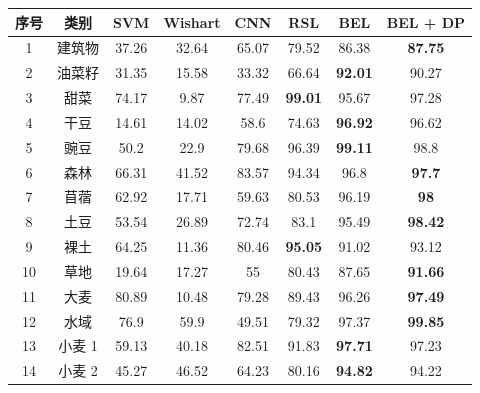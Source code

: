 \begin{table}[ht!]
    \begin{tabular}{cccccccc}
        \toprule[1.5bp]
        序号                        & 类别    & SVM   & Wishart & CNN   & RSL            & BEL            & BEL + DP       \\
        \midrule[0.75bp]
        1                         & 建筑物   & 37.26 & 32.64   & 65.07 & 79.52          & 86.38          & \textbf{87.75} \\
        2                         & 油菜籽   & 31.35 & 15.58   & 33.32 & 66.64          & \textbf{92.01} & 90.27          \\
        3                         & 甜菜    & 74.17 & 9.87    & 77.49 & \textbf{99.01} & 95.67          & 97.28          \\
        4                         & 干豆    & 14.61 & 14.02   & 58.6  & 74.63          & \textbf{96.92} & 96.62          \\
        5                         & 豌豆    & 50.2  & 22.9    & 79.68 & 96.39          & \textbf{99.11} & 98.8           \\
        6                         & 森林    & 66.31 & 41.52   & 83.57 & 94.34          & 96.8           & \textbf{97.7}  \\
        7                         & 苜蓿    & 62.92 & 17.71   & 59.63 & 80.53          & 96.19          & \textbf{98}    \\
        8                         & 土豆    & 53.54 & 26.89   & 72.74 & 83.1           & 95.49          & \textbf{98.42} \\
        9                         & 裸土    & 64.25 & 11.36   & 80.46 & \textbf{95.05} & 91.02          & 93.12          \\
        10                        & 草地    & 19.64 & 17.27   & 55    & 80.43          & 87.65          & \textbf{91.66} \\
        11                        & 大麦    & 80.89 & 10.48   & 79.28 & 89.43          & 96.26          & \textbf{97.49} \\
        12                        & 水域    & 76.9  & 59.9    & 49.51 & 79.32          & 97.37          & \textbf{99.85} \\
        13                        & 小麦 1  & 59.13 & 40.18   & 82.51 & 91.83          & \textbf{97.71} & 97.23          \\
        14                        & 小麦 2  & 45.27 & 46.52   & 64.23 & 80.16          & \textbf{94.82} & 94.22          \\

\end{tabular}
\end{table}
